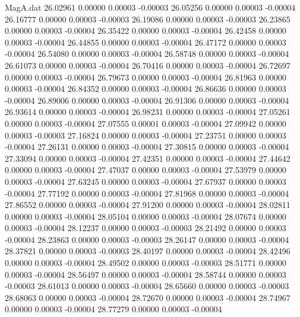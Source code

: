 \begin{filecontents}{MagA.dat}
  26.02961    0.00000    0.00003   -0.00003
  26.05256    0.00000    0.00003   -0.00004
  26.16777    0.00000    0.00003   -0.00003
  26.19086    0.00000    0.00003   -0.00003
  26.23865    0.00000    0.00003   -0.00004
  26.35422    0.00000    0.00003   -0.00004
  26.42458    0.00000    0.00003   -0.00004
  26.44855    0.00000    0.00003   -0.00004
  26.47172    0.00000    0.00003   -0.00004
  26.54080    0.00000    0.00003   -0.00004
  26.58748    0.00000    0.00003   -0.00004
  26.61073    0.00000    0.00003   -0.00004
  26.70416    0.00000    0.00003   -0.00004
  26.72697    0.00000    0.00003   -0.00004
  26.79673    0.00000    0.00003   -0.00004
  26.81963    0.00000    0.00003   -0.00004
  26.84352    0.00000    0.00003   -0.00004
  26.86636    0.00000    0.00003   -0.00004
  26.89006    0.00000    0.00003   -0.00004
  26.91306    0.00000    0.00003   -0.00004
  26.93614    0.00000    0.00003   -0.00004
  26.98231    0.00000    0.00003   -0.00004
  27.05261    0.00000    0.00003   -0.00004
  27.07555    0.00001    0.00003   -0.00004
  27.09942    0.00000    0.00003   -0.00003
  27.16824    0.00000    0.00003   -0.00004
  27.23751    0.00000    0.00003   -0.00004
  27.26131    0.00000    0.00003   -0.00004
  27.30815    0.00000    0.00003   -0.00004
  27.33094    0.00000    0.00003   -0.00004
  27.42351    0.00000    0.00003   -0.00004
  27.44642    0.00000    0.00003   -0.00004
  27.47037    0.00000    0.00003   -0.00004
  27.53979    0.00000    0.00003   -0.00004
  27.63245    0.00000    0.00003   -0.00004
  27.67937    0.00000    0.00003   -0.00004
  27.77192    0.00000    0.00003   -0.00004
  27.81968    0.00000    0.00003   -0.00004
  27.86552    0.00000    0.00003   -0.00004
  27.91200    0.00000    0.00003   -0.00004
  28.02811    0.00000    0.00003   -0.00004
  28.05104    0.00000    0.00003   -0.00004
  28.07674    0.00000    0.00003   -0.00004
  28.12237    0.00000    0.00003   -0.00003
  28.21492    0.00000    0.00003   -0.00004
  28.23863    0.00000    0.00003   -0.00003
  28.26147    0.00000    0.00003   -0.00004
  28.37821    0.00000    0.00003   -0.00003
  28.40197    0.00000    0.00003   -0.00004
  28.42496    0.00000    0.00003   -0.00004
  28.49502    0.00000    0.00003   -0.00003
  28.51771    0.00000    0.00003   -0.00004
  28.56497    0.00000    0.00003   -0.00004
  28.58744    0.00000    0.00003   -0.00003
  28.61013    0.00000    0.00003   -0.00004
  28.65660    0.00000    0.00003   -0.00003
  28.68063    0.00000    0.00003   -0.00004
  28.72670    0.00000    0.00003   -0.00004
  28.74967    0.00000    0.00003   -0.00004
  28.77279    0.00000    0.00003   -0.00004

\end{filecontents}
